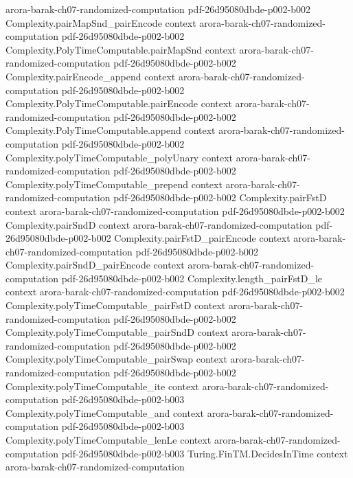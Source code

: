 \begin{theorem}
  {arora-barak-ch07-randomized-computation}
  {pdf-26d95080dbde-p002-b002}
\proofstep
  {Complexity.pairMapSnd_pairEncode}
  {context}
  {arora-barak-ch07-randomized-computation}
  {pdf-26d95080dbde-p002-b002}
\proofstep
  {Complexity.PolyTimeComputable.pairMapSnd}
  {context}
  {arora-barak-ch07-randomized-computation}
  {pdf-26d95080dbde-p002-b002}
\proofstep
  {Complexity.pairEncode_append}
  {context}
  {arora-barak-ch07-randomized-computation}
  {pdf-26d95080dbde-p002-b002}
\proofstep
  {Complexity.PolyTimeComputable.pairEncode}
  {context}
  {arora-barak-ch07-randomized-computation}
  {pdf-26d95080dbde-p002-b002}
\proofstep
  {Complexity.PolyTimeComputable.append}
  {context}
  {arora-barak-ch07-randomized-computation}
  {pdf-26d95080dbde-p002-b002}
\proofstep
  {Complexity.polyTimeComputable_polyUnary}
  {context}
  {arora-barak-ch07-randomized-computation}
  {pdf-26d95080dbde-p002-b002}
\proofstep
  {Complexity.polyTimeComputable_prepend}
  {context}
  {arora-barak-ch07-randomized-computation}
  {pdf-26d95080dbde-p002-b002}
\proofstep
  {Complexity.pairFstD}
  {context}
  {arora-barak-ch07-randomized-computation}
  {pdf-26d95080dbde-p002-b002}
\proofstep
  {Complexity.pairSndD}
  {context}
  {arora-barak-ch07-randomized-computation}
  {pdf-26d95080dbde-p002-b002}
\proofstep
  {Complexity.pairFstD_pairEncode}
  {context}
  {arora-barak-ch07-randomized-computation}
  {pdf-26d95080dbde-p002-b002}
\proofstep
  {Complexity.pairSndD_pairEncode}
  {context}
  {arora-barak-ch07-randomized-computation}
  {pdf-26d95080dbde-p002-b002}
\proofstep
  {Complexity.length_pairFstD_le}
  {context}
  {arora-barak-ch07-randomized-computation}
  {pdf-26d95080dbde-p002-b002}
\proofstep
  {Complexity.polyTimeComputable_pairFstD}
  {context}
  {arora-barak-ch07-randomized-computation}
  {pdf-26d95080dbde-p002-b002}
\proofstep
  {Complexity.polyTimeComputable_pairSndD}
  {context}
  {arora-barak-ch07-randomized-computation}
  {pdf-26d95080dbde-p002-b002}
\proofstep
  {Complexity.polyTimeComputable_pairSwap}
  {context}
  {arora-barak-ch07-randomized-computation}
  {pdf-26d95080dbde-p002-b002}
\proofstep
  {Complexity.polyTimeComputable_ite}
  {context}
  {arora-barak-ch07-randomized-computation}
  {pdf-26d95080dbde-p002-b003}
\proofstep
  {Complexity.polyTimeComputable_and}
  {context}
  {arora-barak-ch07-randomized-computation}
  {pdf-26d95080dbde-p002-b003}
\proofstep
  {Complexity.polyTimeComputable_lenLe}
  {context}
  {arora-barak-ch07-randomized-computation}
  {pdf-26d95080dbde-p002-b003}
\proofstep
  {Turing.FinTM.DecidesInTime}
  {context}
  {arora-barak-ch07-randomized-computation}

\end{theorem}
